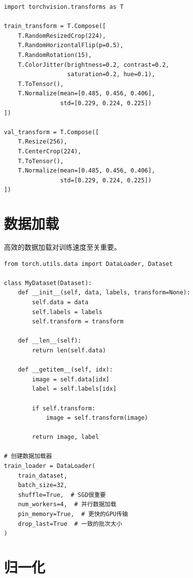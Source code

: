 \begin{code}
    \label{code:augmentation_chinese}
\begin{verbatim}
import torchvision.transforms as T

train_transform = T.Compose([
    T.RandomResizedCrop(224),
    T.RandomHorizontalFlip(p=0.5),
    T.RandomRotation(15),
    T.ColorJitter(brightness=0.2, contrast=0.2, 
                  saturation=0.2, hue=0.1),
    T.ToTensor(),
    T.Normalize(mean=[0.485, 0.456, 0.406],
                std=[0.229, 0.224, 0.225])
])

val_transform = T.Compose([
    T.Resize(256),
    T.CenterCrop(224),
    T.ToTensor(),
    T.Normalize(mean=[0.485, 0.456, 0.406],
                std=[0.229, 0.224, 0.225])
])
\end{verbatim}
\end{code}

\section{数据加载}

高效的数据加载对训练速度至关重要。

\begin{code}
    \label{code:dataloader_chinese}
\begin{verbatim}
from torch.utils.data import DataLoader, Dataset

class MyDataset(Dataset):
    def __init__(self, data, labels, transform=None):
        self.data = data
        self.labels = labels
        self.transform = transform
    
    def __len__(self):
        return len(self.data)
    
    def __getitem__(self, idx):
        image = self.data[idx]
        label = self.labels[idx]
        
        if self.transform:
            image = self.transform(image)
        
        return image, label

# 创建数据加载器
train_loader = DataLoader(
    train_dataset,
    batch_size=32,
    shuffle=True,  # SGD很重要
    num_workers=4,  # 并行数据加载
    pin_memory=True,  # 更快的GPU传输
    drop_last=True  # 一致的批次大小
)
\end{verbatim}
\end{code}

\section{归一化}

